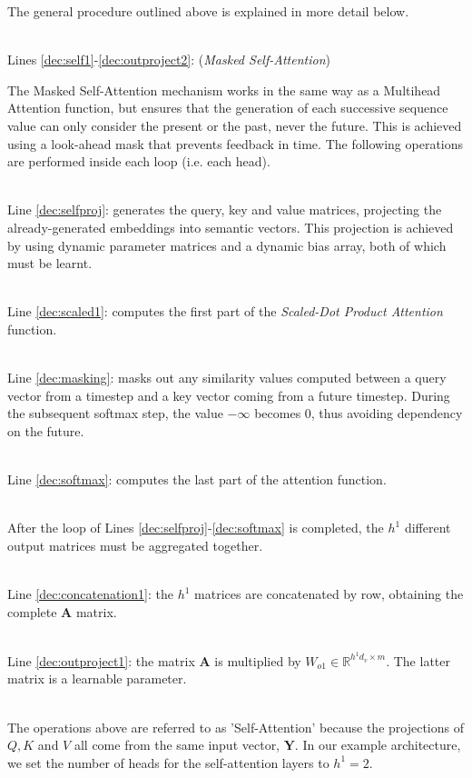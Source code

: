 \documentclass[algorithms,article,submit,pdftex,moreauthors]{Definitions/mdpi}
\begin{document}
The general procedure outlined above is explained in more detail below.

~\\Lines \ref{dec:self1}-\ref{dec:outproject2}: (\textit{Masked Self-Attention})

The Masked Self-Attention mechanism works in the same way as a Multihead Attention function, but ensures that the generation of each successive sequence value can only consider the present or the past, never the future. This is achieved using a look-ahead mask that prevents feedback in time.
The following operations are performed inside each loop (i.e. each head).

~\\Line \ref{dec:selfproj}: generates the query, key and value matrices, projecting the already-generated embeddings into semantic vectors. This projection is achieved by using dynamic parameter matrices and a dynamic bias array, both of which must be learnt.

~\\Line \ref{dec:scaled1}: computes the first part of the \textit{Scaled-Dot Product Attention} function.

~\\Line \ref{dec:masking}: masks out any similarity values computed between a query vector from a timestep and a key vector coming from a future timestep. During the subsequent softmax step, the value $-\infty$ becomes 0, thus avoiding dependency on the future.

~\\Line \ref{dec:softmax}: computes the last part of the attention function.

~\\After the loop of Lines \ref{dec:selfproj}-\ref{dec:softmax} is completed, the $h^1$ different output matrices must be aggregated together.

~\\Line \ref{dec:concatenation1}: the $h^1$ matrices are concatenated by row, obtaining the complete \textbf{A} matrix.

~\\Line \ref{dec:outproject1}: the matrix \textbf{A} is multiplied by $W_{o1} \in \mathbb{R}^{h^1d_v \times m}$. The latter matrix is a learnable parameter.

~\\The operations above are referred to as 'Self-Attention' because the projections of $Q, K$ and $V$ all come from the same input vector, $\textbf{Y}$. In our example architecture, we set the number of heads for the self-attention layers to $h^1 = 2$.
\end{document}
